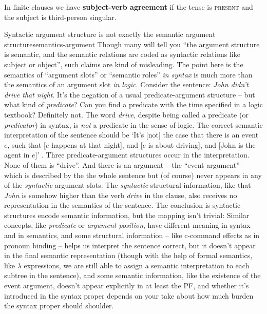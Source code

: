 \documentclass[UTF8, a4paper, oneside, scheme=plain]{ctexrep}
\newcommand*{\concept}[1]{\textbf{#1}}
\newcommand*{\term}[1]{\emph{#1}}
\newcommand{\corpus}[1]{\emph{#1}}
\newcommand{\category}[1]{\textsc{#1}}
\newcommand{\translate}[1]{`#1'}
\begin{document}
In finite clauses we have \concept{subject-verb agreement}
if the tense is \category{present}
and the subject is third-person singular.

\begin{theorybox}{Syntactic argument structure is not exactly the semantic argument structure}{semantics-argument}
    Though many will tell you ``the argument structure is semantic, 
    and the semantic relations are coded as syntactic relations like subject or object'',
    such claims are kind of misleading.
    The point here is the semantics of ``argument slots'' or ``semantic roles'' \emph{in syntax}
    is much more than the semantics of an argument slot \emph{in logic}.
    Consider the sentence: \corpus{John didn't drive that night}. 
    It's the negation of a usual predicate-argument structure
    -- but what kind of \term{predicate}?
    Can you find a predicate with the time specified in a logic textbook?
    Definitely not. 
    The word \corpus{drive}, despite being called a predicate (or \term{predicator}) in syntax,
    is \emph{not} a predicate in the sense of logic.
    The correct semantic interpretation of the sentence should be 
    \translate{It's [not] the case that there is an event $e$, such that
    [$e$ happens at that night], and [$e$ is about driving], 
    and [John is the agent in $e$]} \citep{zeijlstra2013}.
    Three predicate-argument structures occur in the interpretation.
    None of them is ``drive''.
    And there is an argument -- the ``event argument'' --
    which is described by the the whole sentence but (of course) 
    never appears in any of the \emph{syntactic} argument slots.
    The \emph{syntactic} structural information,
    like that \corpus{John} is somehow higher than the verb \corpus{drive} in the clause,
    also receives no representation in the semantics of the sentence.
    The conclusion is syntactic structures encode semantic information,
    but the mapping isn't trivial:
    Similar concepts, like \term{predicate} or \term{argument position},
    have different meaning in syntax and in semantics, and 
    some structural information -- like c-command effects as in pronoun binding --
    helps us interpret the sentence correct,
    but it doesn't appear in the final semantic representation 
    (though with the help of formal semantics, like $\lambda$ expressions,
    we are still able to assign a semantic interpretation to each subtree in the sentence),
    and some semantic information, like the existence of the event argument,
    doesn't appear explicitly in at least the PF, 
    and whether it's introduced in the syntax proper depends on 
    your take about how much burden the syntax proper should shoulder.
\end{theorybox}
\end{document}
